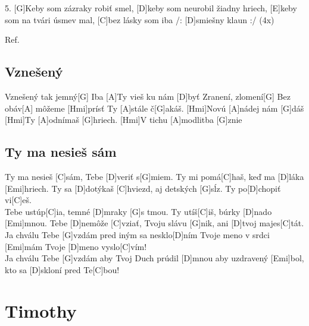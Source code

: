 \documentclass[10pt]{article}
\begin{document}
\begin{Large}
\begin{minipage}{\textwidth}
\begin{guitar}
	5.
	[G]Keby som zázraky robiť smel, [D]keby som neurobil žiadny hriech,
	[E]keby som na tvári úsmev mal, [C]bez lásky som iba  /: [D]smiešny klaun :/ (4x)
	
	Ref.
\end{guitar}
\end{minipage}

\begin{minipage}{\textwidth}
\subsection{Vznešený}
\begin{guitar}	
	[D]Vznešený tak jemný[G]
	Iba [A]Ty vieš ku nám [D]byť
	Zranení, zlomení[G]
	Bez obáv[A] môžeme [Hmi]prísť
	Ty [A]stále č[G]akáš. [Hmi]Novú [A]nádej nám [G]dáš
	[Hmi]Ty [A]odnímaš [G]hriech. [Hmi]V tichu [A]modlitba [G]znie
\end{guitar}
\end{minipage}

\begin{minipage}{\textwidth}
\subsection{Ty ma nesieš sám}
\begin{multicols*}{2}
\begin{guitar}	
	[G]Ty ma nesieš [C]sám, Tebe [D]veriť s[G]miem.
	Ty mi pomá[C]haš, keď ma [D]láka [Emi]hriech.
	Ty sa [D]dotýkaš [C]hviezd, aj detských [G]sĺz.
	Ty po[D]chopiť vi[C]eš.
	\\
	[G]Tebe ustúp[C]ia, temné [D]mraky [G]s tmou.
	Ty utíš[C]iš, búrky [D]nado [Emi]mnou.
	Tebe [D]nemôže [C]vziať, Tvoju slávu [G]nik,
	ani [D]tvoj majes[C]tát.
	\columnbreak
	[C]Ja chválu Tebe [G]vzdám
	pred iným sa nesklo[D]ním
	Tvoje meno v srdci [Emi]mám
	Tvoje [D]meno vyslo[C]vím!
	\\
	[C]Ja chválu Tebe [G]vzdám
	aby Tvoj Duch prúdil [D]mnou
	aby uzdravený [Emi]bol,
	kto sa [D]skloní pred Te[C]bou!
\end{guitar}
\end{multicols*}
\end{minipage}

\newpage

\begin{minipage}{\textwidth}
\section{Timothy}

\end{minipage}
\end{Large}
\end{document}
